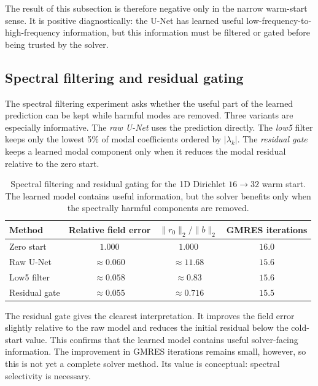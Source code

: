 The result of this subsection is therefore negative only in the narrow
warm-start sense. It is positive diagnostically: the U-Net has learned useful
low-frequency-to-high-frequency information, but this information must be
filtered or gated before being trusted by the solver.

\subsection{Spectral filtering and residual gating}
\label{subsec:results-1d-spectral-filtering}

The spectral filtering experiment asks whether the useful part of the learned
prediction can be kept while harmful modes are removed. Three variants are
especially informative. The \emph{raw U-Net} uses the prediction directly. The
\emph{low5} filter keeps only the lowest 5\% of modal coefficients ordered by
$|\lambda_k|$. The \emph{residual gate} keeps a learned modal component only
when it reduces the modal residual relative to the zero start.

\begin{table}[htbp]
\centering
\caption{Spectral filtering and residual gating for the 1D Dirichlet
$16\to32$ warm start. The learned model contains useful information, but the
solver benefits only when the spectrally harmful components are removed.}
\label{tab:results-1d-filtering}
\begin{tabular}{lccc}
\toprule
Method & Relative field error & $\|r_0\|_2/\|b\|_2$ & GMRES iterations \\
\midrule
Zero start & $1.000$ & $1.000$ & $16.0$ \\
Raw U-Net & $\approx 0.060$ & $\approx 11.68$ & $15.6$ \\
Low5 filter & $\approx 0.058$ & $\approx 0.83$ & $15.6$ \\
Residual gate & $\approx 0.055$ & $\approx 0.716$ & $15.5$ \\
\bottomrule
\end{tabular}
\end{table}

The residual gate gives the clearest interpretation. It improves the field
error slightly relative to the raw model and reduces the initial residual below
the cold-start value. This confirms that the learned model contains useful
solver-facing information. The improvement in GMRES iterations remains small,
however, so this is not yet a complete solver method. Its value is conceptual:
spectral selectivity is necessary.

